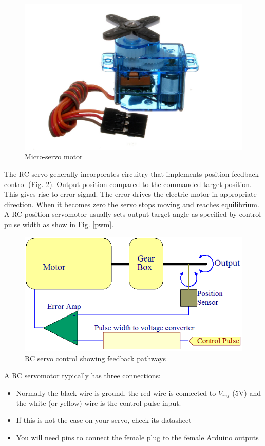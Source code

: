 \documentclass{instructions}
\begin{document}
\begin{figure}[h!]
    \centering
    \includegraphics[width=0.6\linewidth]{figs/servo1}
    \caption{Micro-servo motor}
    \label{servo}
\end{figure}


The RC servo generally incorporates circuitry that implements position
feedback control (Fig. \ref{closedloop}). Output position compared to the commanded
target position. This gives rise to error signal. The error drives the
electric motor in appropriate direction. When it becomes zero the servo
stops moving and reaches equilibrium. A RC position servomotor usually
sets output target angle as specified by control pulse width as show in
Fig. \ref{pwm}.

\begin{figure}[h!]
    \centering
    \includegraphics[width=0.6\linewidth]{figs/servo2}
    \caption{RC servo control showing feedback pathways}
    \label{closedloop}
\end{figure}

A RC servomotor typically has three connections:

\begin{itemize}
    \item Normally the black wire is ground, the red wire is connected to
        $V_{ref}$ (5V)
    and the white (or yellow) wire is the control pulse input.
\item If this is not the case on your servo, check its datasheet
\item You will need pins to connect the female plug to the female Arduino
  outputs
\end{itemize}
\end{document}
